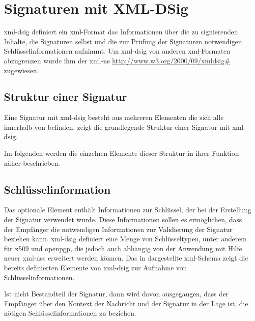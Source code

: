 
\chapter{Signaturen mit XML-DSig}
\label{chap:XML-DSig}
\gls{xml-dsig} definiert ein \gls{xml}-Format das Informationen über die zu signierenden Inhalte, die Signaturen selbst und die zur Prüfung der Signaturen
notwendigen Schlüsselinformationen aufnimmt. Um \gls{xml-dsig} von anderen \gls{xml}-Formaten abzugrenzen wurde ihm der \gls{xml-ns}
\url{http://www.w3.org/2000/09/xmldsig#} zugewiesen.

\section{Struktur einer Signatur}
Eine Signatur mit \gls{xml-dsig} besteht aus mehreren Elementen die sich alle innerhalb von  befinden.  zeigt
die grundlegende Struktur einer Signatur mit \gls{xml-dsig}.



Im folgenden werden die einzelnen Elemente dieser Struktur in ihrer Funktion näher beschrieben. 

\section{Schlüsselinformation}
Das optionale Element  enthält Informationen zur Schlüssel, der bei der Erstellung der Signatur verwendet wurde. Diese Informationen sollen es
ermöglichen, dass der Empfänger die notwendigen Informationen zur Validierung der Signatur beziehen kann. \gls{xml-dsig} definiert eine Menge von
Schlüsseltypen, unter anderem für \gls{x509} und \gls{openpgp}, die jedoch auch abhängig von der Anwendung mit Hilfe neuer \glspl{xml-ns} erweitert werden
können. Das in  dargestellte \gls{xml}-Schema zeigt die bereits definierten Elemente von \gls{xml-dsig} zur Aufnahme von
Schlüsselinformationen.



Ist  nicht Bestandteil der Signatur, dann wird davon ausgegangen, dass der Empfänger über den Kontext der Nachricht und der Signatur in der
Lage ist, die nötigen Schlüsselinformationen zu beziehen.


